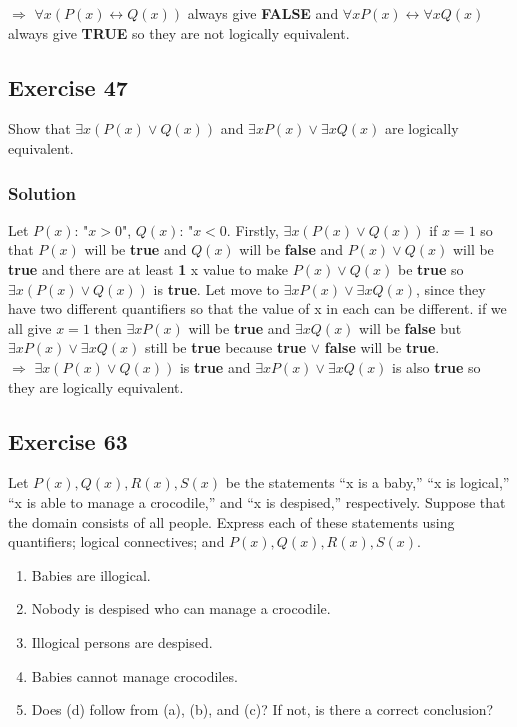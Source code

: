 \documentclass{article}
\begin{document}
$\Rightarrow$ $\forall x(P(x) \leftrightarrow Q(x))$ always give \textbf{FALSE} and $\forall xP(x) \leftrightarrow \forall xQ(x)$ always give \textbf{TRUE} so they are not logically equivalent.

\subsection*{Exercise 47}
Show that $\exists x(P(x) \lor Q(x))$ and $\exists xP(x) \lor \exists xQ(x)$ are logically equivalent.
\subsubsection*{Solution}
Let $P(x)$: "$x > 0$", $Q(x)$: "$x < 0$. Firstly, $\exists x(P(x) \lor Q(x))$ if $x = 1$ so that $P(x)$ will be \textbf{true} and $Q(x)$ will be \textbf{false} and $P(x) \lor Q(x)$ will be \textbf{true} and there are at least \textbf{1} x value to make $P(x) \lor Q(x)$ be \textbf{true} so $\exists x(P(x) \lor Q(x))$ is \textbf{true}. Let move to $\exists xP(x) \lor \exists xQ(x)$, since they have two different quantifiers so that the value of x in each can be different. if we all give $x = 1$ then $\exists xP(x)$ will be \textbf{true} and $\exists xQ(x)$ will be \textbf{false} but $\exists xP(x) \lor \exists xQ(x)$ still be \textbf{true} because \textbf{true} $\lor$ \textbf{false} will be \textbf{true}.\\

$\Rightarrow$ $\exists x(P(x) \lor Q(x))$ is \textbf{true} and $\exists xP(x) \lor \exists xQ(x)$ is also \textbf{true} so they are logically equivalent.
\subsection*{Exercise 63}
Let $P(x), Q(x), R(x), S(x)$ be the statements “x is a baby,” “x is logical,” “x is able to manage a crocodile,” and “x is despised,” respectively. Suppose that the domain consists of all people. Express each of these statements using quantifiers; logical connectives; and $P(x), Q(x), R(x), S(x)$.
\begin{enumerate} [label = (\alph*)]
    \item Babies are illogical.
    \item Nobody is despised who can manage a crocodile.
    \item Illogical persons are despised.
    \item Babies cannot manage crocodiles.
    \item Does (d) follow from (a), (b), and (c)? If not, is there a correct conclusion?
\end{enumerate}
\end{document}
